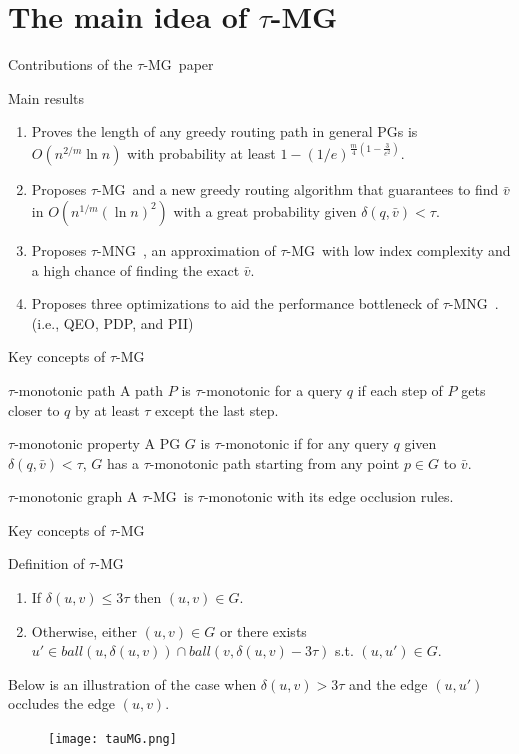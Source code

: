 \documentclass[12pt]{beamer}
\newcommand{\tauMG}{$\tau$-MG\ }
\newcommand{\tauMNG}{$\tau$-MNG\ }
\begin{document}
\section{The main idea of \tauMG}

\begin{frame}{Contributions of the \tauMG paper}
  \begin{block}{Main results} 
    \begin{enumerate}
      \item Proves the length of any greedy routing path in general PGs is $O(n^{2/m}\ln n)$ with probability at least $1-(1 / e)^{\frac{m}{4}\left(1-\frac{3}{e^{2}}\right)}$.
      \item Proposes \tauMG and a new greedy routing algorithm that guarantees to find $\bar{v}$ in $O(n^{1/m} (\ln n)^2)$ with a great probability given $\delta(q, \bar{v}) < \tau$.
      \item Proposes \tauMNG, an approximation of \tauMG with low index complexity and a high chance of finding the exact $\bar{v}$.
      \item Proposes three optimizations to aid the performance bottleneck of \tauMNG. (i.e., QEO, PDP, and PII)
    \end{enumerate}
  \end{block}
\end{frame}

\begin{frame}{Key concepts of \tauMG}
  \begin{block}{$\tau$-monotonic path}
    A path $P$ is $\tau$-monotonic for a query $q$ if each step of $P$ gets closer to $q$ by at least $\tau$ except the last step.
  \end{block}
  \begin{block}{$\tau$-monotonic property}
    A PG $G$ is $\tau$-monotonic if for any query $q$ given $\delta(q, \bar{v}) < \tau$, $G$ has a $\tau$-monotonic path starting from any point $p \in G$ to $\bar{v}$.
  \end{block}
  \begin{block}{$\tau$-monotonic graph}
    A \tauMG is $\tau$-monotonic with its edge occlusion rules.
  \end{block}
\end{frame}

\begin{frame}{Key concepts of \tauMG}
  \begin{block}{Definition of \tauMG}
    \small
    \begin{enumerate}
      \item If $\delta(u, v) \leq 3\tau$ then $(u, v) \in G$.
      \item Otherwise, either $(u, v) \in G$ or there exists $u'\in ball(u, \delta(u, v)) \cap ball(v, \delta(u, v) - 3\tau)$ s.t. $(u, u') \in G$.
    \end{enumerate}
    Below is an illustration of the case when $\delta(u, v) > 3\tau$ and the edge $(u, u')$ occludes the edge $(u, v)$.
  \end{block}
  \begin{figure}
    \raggedbottom
    \texttt{[image: tauMG.png]}
  \end{figure}
\end{frame}
\end{document}
